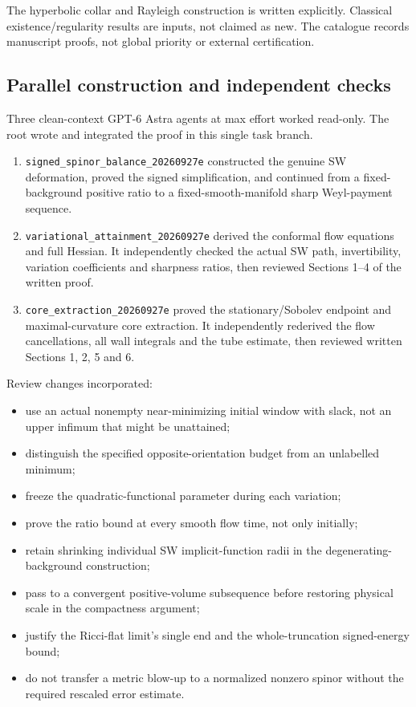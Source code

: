 \documentclass[
  10pt,
]{article}
\providecommand{\tightlist}{%
  \setlength{\itemsep}{0pt}\setlength{\parskip}{0pt}}
\begin{document}
The hyperbolic collar and Rayleigh construction is written explicitly.
Classical existence/regularity results are inputs, not claimed as new.
The catalogue records manuscript proofs, not global priority or external
certification.

\hypertarget{parallel-construction-and-independent-checks}{%
\subsection{Parallel construction and independent
checks}\label{parallel-construction-and-independent-checks}}

Three clean-context GPT-6 Astra agents at max effort worked read-only.
The root wrote and integrated the proof in this single task branch.

\begin{enumerate}
\def\labelenumi{\arabic{enumi}.}
\tightlist
\item
  \nolinkurl{signed_spinor_balance_20260927e} constructed the genuine SW
  deformation, proved the signed simplification, and continued from a
  fixed-background positive ratio to a fixed-smooth-manifold sharp
  Weyl-payment sequence.
\item
  \nolinkurl{variational_attainment_20260927e} derived the conformal flow
  equations and full Hessian. It independently checked the actual SW
  path, invertibility, variation coefficients and sharpness ratios, then
  reviewed Sections 1--4 of the written proof.
\item
  \nolinkurl{core_extraction_20260927e} proved the stationary/Sobolev endpoint and
  maximal-curvature core extraction. It independently rederived the flow
  cancellations, all wall integrals and the tube estimate, then reviewed
  written Sections 1, 2, 5 and 6.
\end{enumerate}

Review changes incorporated:

\begin{itemize}
\tightlist
\item
  use an actual nonempty near-minimizing initial window with slack, not
  an upper infimum that might be unattained;
\item
  distinguish the specified opposite-orientation budget from an
  unlabelled minimum;
\item
  freeze the quadratic-functional parameter during each variation;
\item
  prove the ratio bound at every smooth flow time, not only initially;
\item
  retain shrinking individual SW implicit-function radii in the
  degenerating-background construction;
\item
  pass to a convergent positive-volume subsequence before restoring
  physical scale in the compactness argument;
\item
  justify the Ricci-flat limit's single end and the whole-truncation
  signed-energy bound;
\item
  do not transfer a metric blow-up to a normalized nonzero spinor
  without the required rescaled error estimate.
\end{itemize}
\end{document}
